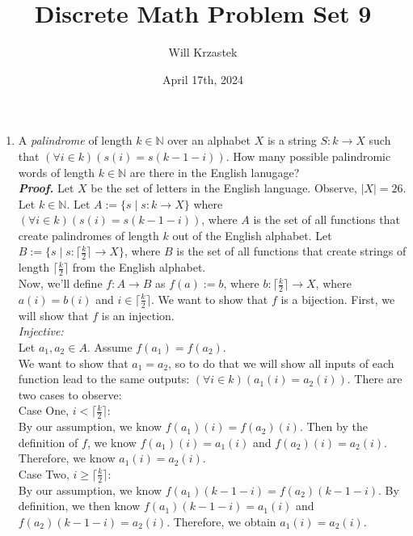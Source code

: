 \documentclass[11pt,a4paper]{article}
\begin{document}
 
\title{Discrete Math Problem Set 9}
\author{Will Krzastek}
\date{April 17th, 2024}
\maketitle

\begin{enumerate}
    
    \item 
    A \emph{palindrome} of length $k \in \mathbb{N}$ over an alphabet $X$ is a string $S: k \rightarrow X $
    such that $(\forall i \in k)(s(i) = s(k - 1 - i)) $. How many possible palindromic words of length $k \in \mathbb{N} $ are there in the English lanugage? \bigskip \\
    \emph{\textbf{Proof.}} Let $X$ be the set of letters in the English language. Observe, $|X| = 26$. Let $k \in \mathbb{N}$.
    Let $A := \{s \mid s: k \rightarrow X \} $ where $(\forall i \in k)(s(i) = s(k - 1 - i)) $, where $A$ is the set of all functions that create palindromes of length $k$ out of the English alphabet. 
    Let $B := \{s \mid s: \lceil \frac{k}{2} \rceil \rightarrow X \} $, where $B$ is the set of all functions that create strings of length $\lceil \frac{k}{2} \rceil $ from the English alphabet. \\
    Now, we'll define $f: A \rightarrow B $ as $f(a) := b$, where $b: \lceil \frac{k}{2} \rceil \rightarrow X$, where $a(i) = b(i)  $ and $i \in \lceil \frac{k}{2} \rceil $. We want to show that $f$ is a bijection. First, we will show that $f$ is an injection. \\
    \emph{Injective:} \\
    Let $a_1, a_2 \in A $. Assume $f(a_1) = f(a_2) $. \\
    We want to show that $a_1 = a_2 $, so to do that we will show all inputs of each function lead to the same outputs: $(\forall i \in k)(a_1(i) = a_2(i)) $. There are two cases to observe: \\
    Case One, $i < \lceil \frac{k}{2} \rceil $: \\
    By our assumption, we know $f(a_1)(i) = f(a_2)(i) $. Then by the definition of $f$, we know $f(a_1)(i) = a_1(i) $ and $f(a_2)(i) = a_2(i) $. Therefore, we know $a_1(i) = a_2(i) $. \\
    Case Two, $i \geq \lceil \frac{k}{2} \rceil $: \\
    By our assumption, we know $f(a_1)(k - 1 - i) = f(a_2)(k - 1 - i) $. By definition, we then know $f(a_1)(k - 1 - i) = a_1(i) $ and $f(a_2)(k - 1 - i) = a_2(i) $. Therefore, we obtain $a_1(i) = a_2(i) $.  \\

\end{enumerate}
\end{document}
